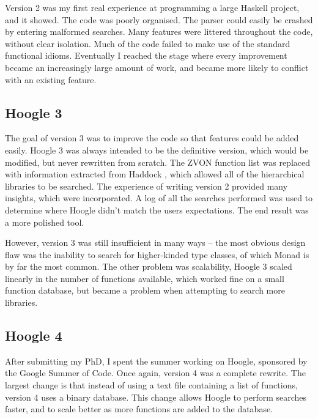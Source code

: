 \documentclass{tmr}
\newcommand{\code}[1]{\textsf{#1}}
\begin{document}
Version 2 was my first real experience at programming a large Haskell project, and it showed. The code was poorly organised. The parser could easily be crashed by entering malformed searches. Many features were littered throughout the code, without clear isolation. Much of the code failed to make use of the standard functional idioms. Eventually I reached the stage where every improvement became an increasingly large amount of work, and became more likely to conflict with an existing feature.

\subsection{Hoogle 3}

The goal of version 3 was to improve the code so that features could be added easily. Hoogle 3 was always intended to be the definitive version, which would be modified, but never rewritten from scratch. The ZVON function list was replaced with information extracted from Haddock \cite{haddock}, which allowed all of the hierarchical libraries to be searched. The experience of writing version 2 provided many insights, which were incorporated. A log of all the searches performed was used to determine where Hoogle didn't match the users expectations. The end result was a more polished tool.

However, version 3 was still insufficient in many ways -- the most obvious design flaw was the inability to search for higher-kinded type classes, of which \code{Monad} is by far the most common. The other problem was scalability, Hoogle 3 scaled linearly in the number of functions available, which worked fine on a small function database, but became a problem when attempting to search more libraries.

\subsection{Hoogle 4}

After submitting my PhD, I spent the summer working on Hoogle, sponsored by the Google Summer of Code. Once again, version 4 was a complete rewrite. The largest change is that instead of using a text file containing a list of functions, version 4 uses a binary database. This change allows Hoogle to perform searches faster, and to scale better as more functions are added to the database.
\end{document}
